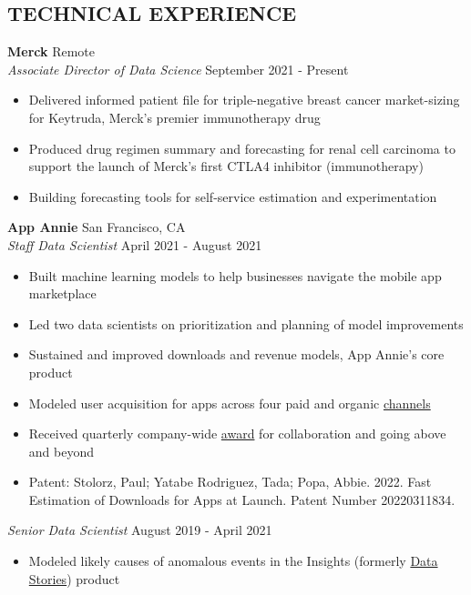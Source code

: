 \documentclass[line,margin,10pt]{res}
\begin{document}
\begin{resume}
\section{TECHNICAL EXPERIENCE}
\textbf{Merck} \hfill Remote\\
{\sl Associate Director of Data Science} \hfill September 2021 - Present
\begin{itemize} \itemsep -2pt
	\item Delivered informed patient file for triple-negative breast cancer market-sizing for Keytruda, Merck's premier immunotherapy drug
	\item Produced drug regimen summary and forecasting for renal cell carcinoma to support the launch of Merck's first CTLA4 inhibitor (immunotherapy)
	\item Building forecasting tools for self-service estimation and experimentation
\end{itemize}
{\vspace{-0.25cm}}
\textbf{App Annie} \hfill San Francisco, CA\\
{\sl Staff  Data Scientist} \hfill April 2021 - August 2021
\begin{itemize} \itemsep -2pt
\item Built machine learning models to help businesses navigate the mobile app marketplace
\item Led two data scientists on prioritization and planning of model improvements
\item Sustained and improved downloads and revenue models, App Annie's core product
\item Modeled user acquisition for apps across four paid and organic \href{https://www.appannie.com/en/insights/product-announcements/understand-paid-vs-organic-downloads-with-improved-download-channel-report/}{channels}
\item Received quarterly company-wide \href{https://www.linkedin.com/pulse/meet-abbie-popa-staff-data-scientist-from-our-amer-region-thomas/?trackingId=BPJh%2B6dFR%2Baz%2BUpkpGznRA%3D%3D}{award} for collaboration and going above and beyond
\item Patent: Stolorz, Paul; Yatabe Rodriguez, Tada; Popa, Abbie. 2022. Fast Estimation of Downloads for Apps at Launch. Patent Number 20220311834.
\end{itemize}
{\vspace{-0.25cm}}
{\sl Senior Data Scientist} \hfill August 2019 - April 2021
\begin{itemize} \itemsep -2pt
\item Modeled likely causes of anomalous events in the Insights (formerly \href{https://www.appannie.com/en/insights/product-announcements/data-stories-labs/}{Data Stories}) product

\end{itemize}
\end{resume}
\end{document}
